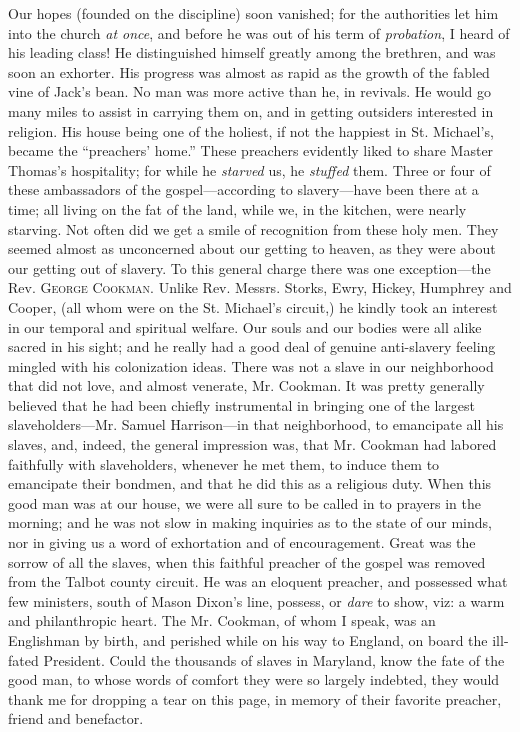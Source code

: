 Our hopes (founded on the discipline) soon vanished; for the authorities
let him into the church \emph{at once}, and before he was out of his
term of \emph{probation}, I heard of his leading class! He distinguished
himself greatly among the brethren, and was soon an exhorter. His
progress was almost as rapid as the growth of the fabled vine of Jack's
bean. No man was more active than he, in revivals. He would go many
miles to assist in carrying them on, and in getting outsiders interested
in religion. His house being one of the holiest, if not the happiest in
St. Michael's, became the ``preachers' home.'' These preachers evidently
liked to share Master Thomas's hospitality; for while he \emph{starved}
us, he \emph{stuffed} them. Three or four of these {}ambassadors of the
gospel---according to slavery---have been there at a time; all living on
the fat of the land, while we, in the kitchen, were nearly starving. Not
often did we get a smile of recognition from these holy men. They seemed
almost as unconcerned about our getting to heaven, as they were about
our getting out of slavery. To this general charge there was one
exception---the Rev. \textsc{George Cookman}. Unlike Rev. Messrs.
Storks, Ewry, Hickey, Humphrey and Cooper, (all whom were on the St.
Michael's circuit,) he kindly took an interest in our temporal and
spiritual welfare. Our souls and our bodies were all alike sacred in his
sight; and he really had a good deal of genuine anti-slavery feeling
mingled with his colonization ideas. There was not a slave in our
neighborhood that did not love, and almost venerate, Mr. Cookman. It was
pretty generally believed that he had been chiefly instrumental in
bringing one of the largest slaveholders---Mr. Samuel Harrison---in that
neighborhood, to emancipate all his slaves, and, indeed, the general
impression was, that Mr. Cookman had labored faithfully with
slaveholders, whenever he met them, to induce them to emancipate their
bondmen, and that he did this as a religious duty. When this good man
was at our house, we were all sure to be called in to prayers in the
morning; and he was not slow in making inquiries as to the state of our
minds, nor in giving us a word of exhortation and of encouragement.
Great was the sorrow of all the slaves, when this faithful preacher of
the gospel was removed from the Talbot county circuit. He was an
eloquent preacher, and possessed what few ministers, {}south of Mason
Dixon's line, possess, or \emph{dare} to show, viz: a warm and
philanthropic heart. The Mr. Cookman, of whom I speak, was an Englishman
by birth, and perished while on his way to England, on board the
ill-fated President. Could the thousands of slaves in Maryland, know the
fate of the good man, to whose words of comfort they were so largely
indebted, they would thank me for dropping a tear on this page, in
memory of their favorite preacher, friend and benefactor.

